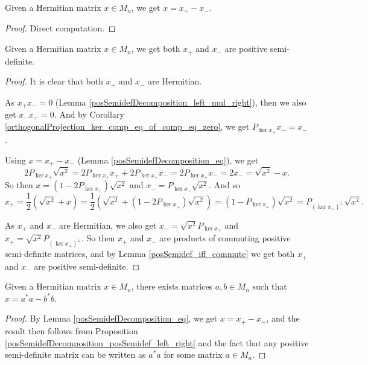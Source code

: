  \begin{lemma}\label{posSemidefDecomposition_eq}
  \leanok
  Given a Hermitian matrix $x\in M_n$, we get $x=x_+-x_-$.
 \end{lemma}
 \begin{proof}\leanok
  Direct computation.
 \end{proof}
 
 \begin{proposition}\label{posSemidefDecomposition_posSemidef_left_right}
  \leanok
  Given a Hermitian matrix $x\in M_n$, we get both $x_+$ and $x_-$ are positive semi-definite.
 \end{proposition}
 \begin{proof}
  \leanok
  It is clear that both $x_+$ and $x_-$ are Hermitian.
  
  As $x_+x_-=0$ (Lemma \ref{posSemidefDecomposition_left_mul_right}), then we also get $x_-x_+=0$. And by Corollary \ref{orthogonalProjection_ker_comp_eq_of_comp_eq_zero}, we get $P_{\ker{x_+}}x_-=x_-$.
 
  Using $x=x_+-x_-$ (Lemma \ref{posSemidefDecomposition_eq}),
  we get \[2P_{\ker{x_+}}\sqrt{x^2}=2P_{\ker{x_+}}x_++2P_{\ker{x_+}}x_-=2P_{\ker{x_+}}x_-=2x_-=\sqrt{x^2}-x.\]
  So then $x=(1-2P_{\ker{x_+}})\sqrt{x^2}$ and $x_-=P_{\ker{x_+}}\sqrt{x^2}$. And so \[x_+=\dfrac{1}{2}(\sqrt{x^2}+x)=\dfrac{1}{2}(\sqrt{x^2}+(1-2P_{\ker{x_+}})\sqrt{x^2})=(1-P_{\ker{x_+}})\sqrt{x^2}=P_{{(\ker{x_+})}^\bot}\sqrt{x^2}.\]
  
  As $x_+$ and $x_-$ are Hermitian, we also get $x_-=\sqrt{x^2}P_{\ker{x_+}}$ and $x_+=\sqrt{x^2}P_{{(\ker{x_+})}^\bot}$. So then $x_+$ and $x_-$ are products of commuting positive semi-definite matrices, and by Lemma \ref{posSemidef_iff_commute} we get both $x_+$ and $x_-$ are positive semi-definite.
 \end{proof}

 \begin{corollary}\label{posSemidefDecomposition'}
  \leanok
  Given a Hermitian matrix $x\in M_n$, there exists matrices $a,b\in M_n$ such that $x = a^*a - b^*b$.
 \end{corollary}
 \begin{proof}
  \leanok
  By Lemma \ref{posSemidefDecomposition_eq}, we get $x=x_+-x_-$, and the result then follows from Proposition \ref{posSemidefDecomposition_posSemidef_left_right} and the fact that any positive semi-definite matrix can be written as $a^*a$ for some matrix $a\in M_n$.
 \end{proof}

